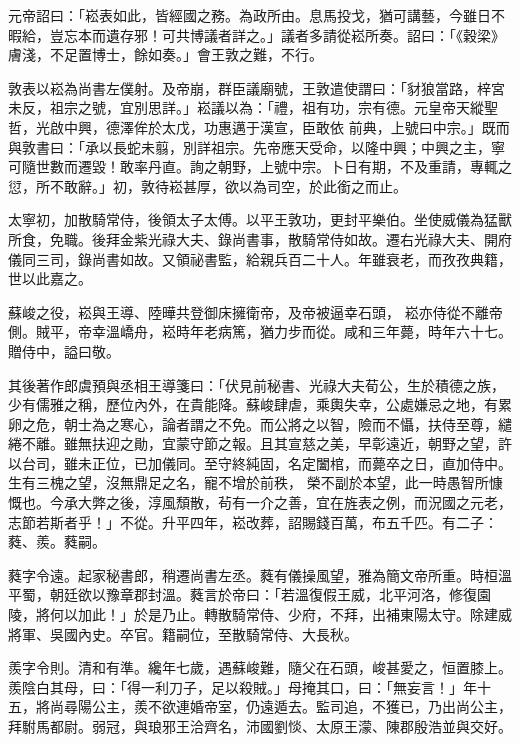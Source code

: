 \begin{pinyinscope}
 元帝詔曰：「崧表如此，皆經國之務。為政所由。息馬投戈，猶可講藝，今雖日不暇給，豈忘本而遺存邪！可共博議者詳之。」議者多請從崧所奏。詔曰：「《穀梁》膚淺，不足置博士，餘如奏。」會王敦之難，不行。



 敦表以崧為尚書左僕射。及帝崩，群臣議廟號，王敦遣使謂曰：「豺狼當路，梓宮未反，祖宗之號，宜別思詳。」崧議以為：「禮，祖有功，宗有德。元皇帝天縱聖哲，光啟中興，德澤侔於太戊，功惠邁于漢宣，臣敢依
 前典，上號曰中宗。」既而與敦書曰：「承以長蛇未翦，別詳祖宗。先帝應天受命，以隆中興；中興之主，寧可隨世數而遷毀！敢率丹直。詢之朝野，上號中宗。卜日有期，不及重請，專輒之愆，所不敢辭。」初，敦待崧甚厚，欲以為司空，於此銜之而止。



 太寧初，加散騎常侍，後領太子太傅。以平王敦功，更封平樂伯。坐使威儀為猛獸所食，免職。後拜金紫光祿大夫、錄尚書事，散騎常侍如故。遷右光祿大夫、開府儀同三司，錄尚書如故。又領祕書監，給親兵百二十人。年雖衰老，而孜孜典籍，世以此嘉之。



 蘇峻之役，崧與王導、陸曄共登御床擁衛帝，及帝被逼幸石頭，
 崧亦侍從不離帝側。賊平，帝幸溫嶠舟，崧時年老病篤，猶力步而從。咸和三年薨，時年六十七。贈侍中，謚曰敬。



 其後著作郎虞預與丞相王導箋曰：「伏見前秘書、光祿大夫荀公，生於積德之族，少有儒雅之稱，歷位內外，在貴能降。蘇峻肆虐，乘輿失幸，公處嫌忌之地，有累卵之危，朝士為之寒心，論者謂之不免。而公將之以智，險而不懾，扶侍至尊，繾綣不離。雖無扶迎之勛，宜蒙守節之報。且其宣慈之美，早彰遠近，朝野之望，許以台司，雖未正位，已加儀同。至守終純固，名定闔棺，而薨卒之日，直加侍中。生有三槐之望，沒無鼎足之名，寵不增於前秩，
 榮不副於本望，此一時愚智所慷慨也。今承大弊之後，淳風頹散，茍有一介之善，宜在旌表之例，而況國之元老，志節若斯者乎！」不從。升平四年，崧改葬，詔賜錢百萬，布五千匹。有二子：蕤、羨。蕤嗣。



 蕤字令遠。起家秘書郎，稍遷尚書左丞。蕤有儀操風望，雅為簡文帝所重。時桓溫平蜀，朝廷欲以豫章郡封溫。蕤言於帝曰：「若溫復假王威，北平河洛，修復園陵，將何以加此！」於是乃止。轉散騎常侍、少府，不拜，出補東陽太守。除建威將軍、吳國內史。卒官。籍嗣位，至散騎常侍、大長秋。



 羨字令則。清和有準。纔年七歲，遇蘇峻難，隨父在石頭，峻甚愛之，恒置膝上。羨陰白其母，曰：「得一利刀子，足以殺賊。」母掩其口，曰：「無妄言！」年十五，將尚尋陽公主，羨不欲連婚帝室，仍遠遁去。監司追，不獲已，乃出尚公主，拜駙馬都尉。弱冠，與琅邪王洽齊名，沛國劉惔、太原王濛、陳郡殷浩並與交好。




\end{pinyinscope}
